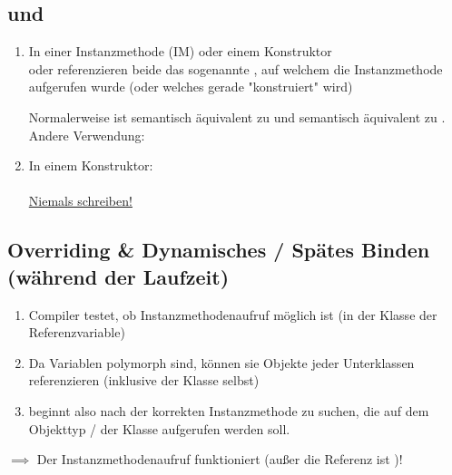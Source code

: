 \subsection{ und }
\begin{enumerate}[label=(\roman*)]
	\item In einer Instanzmethode (IM) oder einem Konstruktor\\
	 oder  referenzieren beide das sogenannte , auf welchem die Instanzmethode aufgerufen wurde (oder welches gerade "konstruiert" wird)\\

\begin{figure}[H] %
	\begin{center}
		
	\end{center}
\end{figure}

Normalerweise ist  semantisch äquivalent zu  und  semantisch äquivalent zu .
\newpage %
\\
Andere Verwendung:\\
	\item In einem Konstruktor:\\
	\\
	\href{https://stackoverflow.com/questions/586363/why-is-super-super-method-not-allowed-in-java}{Niemals  schreiben!}
\end{enumerate}

\subsection{Overriding \& Dynamisches / Spätes Binden (während der Laufzeit)}
\begin{enumerate}[label=(\arabic*)]
	\item Compiler testet, ob Instanzmethodenaufruf möglich ist
	(in der Klasse der Referenzvariable)
	\item Da Variablen polymorph sind, können sie Objekte jeder Unterklassen referenzieren (inklusive der Klasse selbst)
	\item {} beginnt also nach der korrekten Instanzmethode zu suchen, die auf dem Objekttyp / der Klasse aufgerufen werden soll.
\end{enumerate}
$\implies$ Der Instanzmethodenaufruf funktioniert  (außer die Referenz ist )!

